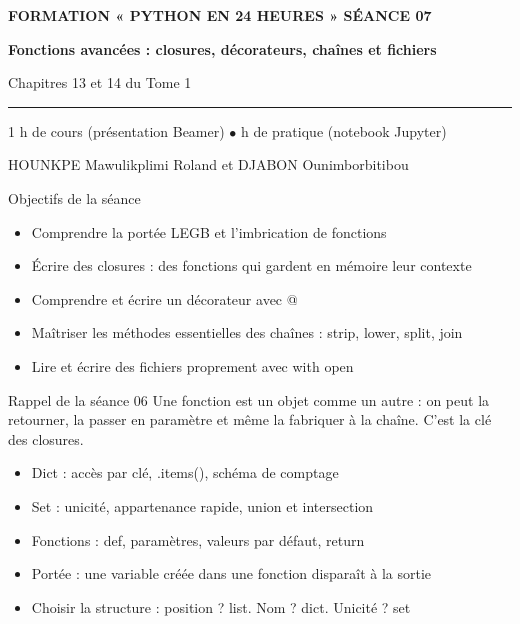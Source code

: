 \documentclass[aspectratio=169,11pt]{beamer}
\begin{document}
{%
\begin{frame}[plain]
\vspace{10mm}
{\color{PyJaune}\small\bfseries FORMATION « PYTHON EN 24 HEURES » \quad\textbar\quad SÉANCE 07\par}
\vspace{4mm}
{\color{white}\Huge\bfseries Fonctions avancées : closures, décorateurs, chaînes et fichiers\par}
\vspace{4mm}
{\color{PyBleuClair}\large Chapitres 13 et 14 du Tome 1\par}
\vspace{7mm}
{\color{PyJaune}\rule{34mm}{2.2pt}\par}
\vspace{7mm}
{\color{white}\normalsize 1 h de cours (présentation Beamer) \quad$\bullet$ h de pratique (notebook Jupyter)\par}
\vspace{2.5mm}
{\color{PyBleuClair}\normalsize HOUNKPE Mawulikplimi Roland et DJABON Ounimborbitibou\par}
\end{frame}
}
\begin{frame}{Objectifs de la séance}
\begin{itemize}
  \item Comprendre la portée LEGB et l'imbrication de fonctions
  \item Écrire des closures : des fonctions qui gardent en mémoire leur contexte
  \item Comprendre et écrire un décorateur avec @
  \item Maîtriser les méthodes essentielles des chaînes : strip, lower, split, join
  \item Lire et écrire des fichiers proprement avec with open
\end{itemize}
\end{frame}
\begin{frame}{Rappel de la séance 06}
Une fonction est un objet comme un autre : on peut la retourner, la passer en paramètre et même la fabriquer à la chaîne. C'est la clé des closures.

\begin{itemize}
  \item Dict : accès par clé, .items(), schéma de comptage
  \item Set : unicité, appartenance rapide, union et intersection
  \item Fonctions : def, paramètres, valeurs par défaut, return
  \item Portée : une variable créée dans une fonction disparaît à la sortie
  \item Choisir la structure : position ? list. Nom ? dict. Unicité ? set
\end{itemize}
\end{frame}
\end{document}

